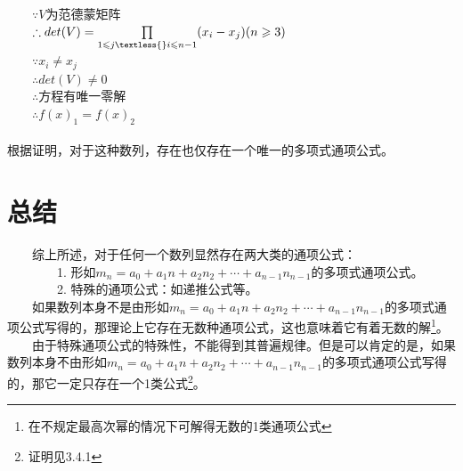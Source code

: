 \documentclass[12pt]{article}
\begin{document}
          　　$\because V$为范德蒙矩阵\\
          　　$\therefore det(V)=\prod\limits_{1\leqslant{}j\textless{}i\leqslant{}n-1}(x_{i}-x_{j}) (n\geqslant{}3)$\\
          　　$\because x_{i}\neq{}x_{j}$\\
          　　$\therefore det(V)\neq0$\\
          　　$\therefore$方程有唯一零解\\
          　　$\therefore f(x)_{1}=f(x)_{2}$\\
        \\
        根据证明，对于这种数列，存在也仅存在一个唯一的多项式通项公式。
      \section{总结}
        　　综上所述，对于任何一个数列显然存在两大类的通项公式：\\
        　　　　1. 形如$m_{n}=a_{0}+a_{1}n+a_{2}n_{2}+\cdots+a_{n-1}n_{n-1}$的多项式通项公式。\\
        　　　　2. 特殊的通项公式：如递推公式等。\\
        　　如果数列本身不是由形如$m_{n}=a_{0}+a_{1}n+a_{2}n_{2}+\cdots+a_{n-1}n_{n-1}$的多项式通项公式写得的，那理论上它存在无数种通项公式，这也意味着它有着无数的解\footnote{在不规定最高次幂的情况下可解得无数的1类通项公式}。\\
        　　由于特殊通项公式的特殊性，不能得到其普遍规律。但是可以肯定的是，如果数列本身不由形如$m_{n}=a_{0}+a_{1}n+a_{2}n_{2}+\cdots+a_{n-1}n_{n-1}$的多项式通项公式写得的，那它一定只存在一个1类公式\footnote{证明见3.4.1}。
\end{document}
